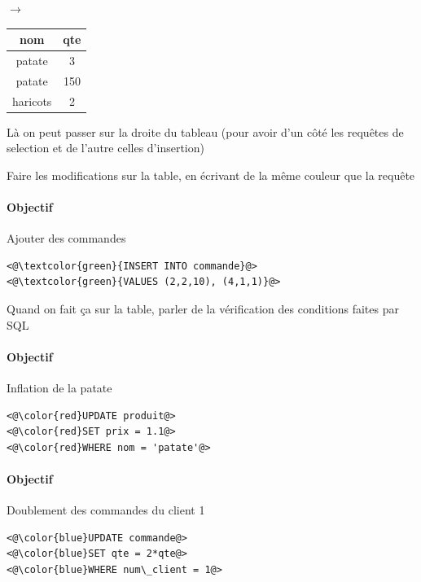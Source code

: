 $\longrightarrow$ \qquad \begin{tabular}{|c|c|}
	\multicolumn{1}{c}{nom} & \multicolumn{1}{c}{qte} \\ \hline
	patate & 3 \\ \hline
	patate & 150 \\ \hline
	haricots & 2 \\ \hline
\end{tabular}

\begin{com}
	Là on peut passer sur la droite du tableau (pour avoir d'un côté les requêtes de selection et de l'autre celles d'insertion)
\end{com}


\begin{com}
	Faire les modifications sur la table, en écrivant de la même couleur que la requête
\end{com}
\paragraph{Objectif} Ajouter des commandes


\begin{lstlisting}
<@\textcolor{green}{INSERT INTO commande}@>
<@\textcolor{green}{VALUES (2,2,10), (4,1,1)}@>
\end{lstlisting}

\begin{com}
	Quand on fait ça sur la table, parler de la vérification des conditions faites par SQL
\end{com}

\paragraph{Objectif} Inflation de la patate

\begin{lstlisting}
<@\color{red}UPDATE produit@>
<@\color{red}SET prix = 1.1@>
<@\color{red}WHERE nom = 'patate'@>
\end{lstlisting}

\paragraph{Objectif} Doublement des commandes du client 1

\begin{lstlisting}
<@\color{blue}UPDATE commande@>
<@\color{blue}SET qte = 2*qte@>
<@\color{blue}WHERE num\_client = 1@>
\end{lstlisting}

